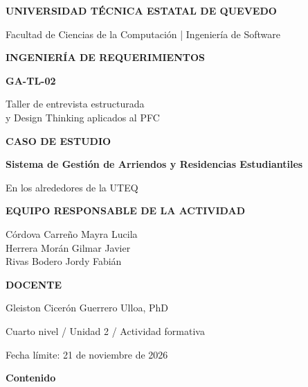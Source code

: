 \documentclass[12pt,a4paper]{article}
\newcommand{\etiqueta}[1]{{\sffamily\footnotesize\bfseries\color{acento} #1}}
\begin{document}
\begin{titlepage}
\thispagestyle{empty}
\vspace*{0.75cm}
{\sffamily\color{white}\small\bfseries UNIVERSIDAD TÉCNICA ESTATAL DE QUEVEDO\par}
\vspace{0.18cm}
{\sffamily\color{white}\small Facultad de Ciencias de la Computación \quad | \quad Ingeniería de Software\par}
\vspace{1.05cm}
{\sffamily\color{white}\large\bfseries INGENIERÍA DE REQUERIMIENTOS\par}
\vspace{0.15cm}
{\sffamily\color{white}\fontsize{30}{36}\selectfont\bfseries GA-TL-02\par}
\vspace{0.16cm}
{\sffamily\color{white}\large Taller de entrevista estructurada\\ y Design Thinking aplicados al PFC\par}
\vspace{1.9cm}
\etiqueta{CASO DE ESTUDIO}\par
\vspace{0.3cm}
{\Large\bfseries\color{azul} Sistema de Gestión de Arriendos y Residencias Estudiantiles\par}
{\large\color{gris} En los alrededores de la UTEQ\par}
\vspace{1.05cm}
\etiqueta{EQUIPO RESPONSABLE DE LA ACTIVIDAD}\par
\vspace{0.2cm}
{\normalsize Córdova Carreño Mayra Lucila\\ Herrera Morán Gilmar Javier\\ Rivas Bodero Jordy Fabián\par}
\vspace{0.75cm}
\etiqueta{DOCENTE}\par
\vspace{0.2cm}
Gleiston Cicerón Guerrero Ulloa, PhD\par
\vfill
{\small\color{gris} Cuarto nivel \quad / \quad Unidad 2 \quad / \quad Actividad formativa\par}
{\small\color{gris} Fecha límite: 21 de noviembre de 2026\par}
\vspace{1cm}
\end{titlepage}
\thispagestyle{fancy}
{\Large\bfseries\color{azul} Contenido}\par\vspace{0.4cm}
{\small\setcounter{tocdepth}{1}\tableofcontents}
\newpage
\end{document}
